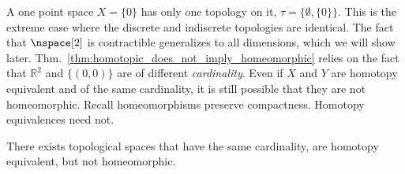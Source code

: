\documentclass{book}                                                           %
\begin{document}
                \begin{minipage}{0.54\textwidth}
                    A one point space $X=\{0\}$ has only one topology on it,
                    $\tau=\{\emptyset,\{0\}\}$. This is the extreme case where
                    the discrete and indiscrete topologies are identical. The
                    fact that $\nspace[2]$ is contractible generalizes to all
                    dimensions, which we will show later.
                    Thm.~\ref{thm:homotopic_does_not_imply_homeomorphic} relies
                    on the fact that $\mathbb{R}^{2}$ and $\{(0,0)\}$ are of
                    different \textit{cardinality}. Even if $X$ and $Y$ are
                    homotopy equivalent and of the same cardinality, it is still
                    possible that they are not homeomorphic. Recall
                    homeomorphisms preserve compactness. Homotopy equivalences
                    need not.
                \end{minipage}
                \hfill
                \par\hfill\par
                \begin{theorem}
                    \label{thm:HE_of_Punc_Plane_and_Circle_Not_Homeo}%
                    There exists topological spaces that have the same
                    cardinality, are homotopy equivalent, but not homeomorphic.
                \end{theorem}
\end{document}
